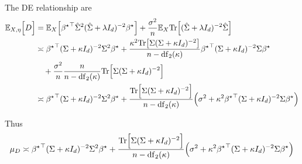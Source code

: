 The DE relationship are
\begin{align*}
\mathbb{E}_{X,\eta}\Big[D\Big] & =\mathbb{E}_{X}\Big[{{\beta^{\star}}}^{\top}\hat{\Sigma}^{2}(\hat{\Sigma}+\lambda I_{d})^{-2}{\beta^{\star}}\Big]+\frac{\sigma^{2}}{n}\mathbb{E}_{X}\mathrm{Tr}\Big[(\hat{\Sigma}+\lambda I_{d})^{-2}\hat{\Sigma}\Big]\\
 & \asymp{{\beta^{\star}}}^{\top}(\Sigma+\kappa I_{d})^{-2}\Sigma^{2}{\beta^{\star}}+\frac{\kappa^{2}\mbox{Tr}\big[\Sigma(\Sigma+\kappa I_{d})^{-2}\big]}{n-\mathrm{df}_{2}(\kappa)}{{\beta^{\star}}}^{\top}(\Sigma+\kappa I_{d})^{-2}\Sigma{\beta^{\star}}\\
 & \quad+\frac{\sigma^{2}}{n}\frac{n}{n-\mathrm{df}_{2}(\kappa)}\mathrm{Tr}\Big[\Sigma(\Sigma+\kappa I_{d})^{-2}\Big]\\
 & \asymp{{\beta^{\star}}}^{\top}(\Sigma+\kappa I_{d})^{-2}\Sigma^{2}{\beta^{\star}}+\frac{\mathrm{Tr}\Big[\Sigma(\Sigma+\kappa I_{d})^{-2}\Big]}{n-\mathrm{df}_{2}(\kappa)}\Big(\sigma^{2}+\kappa^{2}{{\beta^{\star}}}^{\top}(\Sigma+\kappa I_{d})^{-2}\Sigma{\beta^{\star}}\Big)
\end{align*}

Thus
\begin{equation}
\mu_{D}\asymp{{\beta^{\star}}}^{\top}(\Sigma+\kappa I_{d})^{-2}\Sigma^{2}{\beta^{\star}}+\frac{\mathrm{Tr}\Big[\Sigma(\Sigma+\kappa I_{d})^{-2}\Big]}{n-\mathrm{df}_{2}(\kappa)}\Big(\sigma^{2}+\kappa^{2}{{\beta^{\star}}}^{\top}(\Sigma+\kappa I_{d})^{-2}\Sigma{\beta^{\star}}\Big)\label{eq:mean_denom_sqnorm}
\end{equation}

